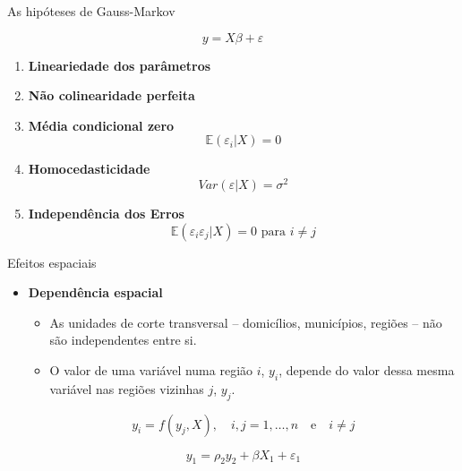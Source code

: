 \documentclass[aspectratio=169]{beamer}
\begin{document}
\begin{frame}{As hipóteses de Gauss-Markov}
	\begin{block}{}
	    \begin{equation}
        y = X\beta + \varepsilon
    \end{equation}
    \end{block}
    \begin{enumerate}
        \item \textbf{Lineariedade dos parâmetros}
        
        \item \textbf{Não colinearidade perfeita}
        
        \item \textbf{Média condicional zero}
        $$ \mathbb{E}(\varepsilon_i| X)=0$$
        
        \item \textbf{Homocedasticidade}
        $$Var(\varepsilon|X) = \sigma^2$$
        
        \item \textbf{Independência dos Erros}
        $$\mathbb{E}(\varepsilon_i \varepsilon_j | X) = 0  \text{ para } i \neq j$$
    \end{enumerate}
\end{frame}

\begin{frame}{Efeitos espaciais}
	\begin{itemize}
		\item \textbf{Dependência espacial}
		\vspace{0.5cm}
		\begin{itemize}
		    \item As unidades de corte transversal -- domicílios, municípios, regiões -- não são independentes entre si.
		    \item O valor de uma variável numa região $i$, $y_i$, depende do valor dessa mesma variável nas regiões vizinhas $j$, $y_j$. 
		\end{itemize}
		\vspace{0.5cm}
		\begin{block}{}
		    $$y_i = f(y_j,X), \quad i,j = 1,\dots, n \quad\text{e}\quad i\neq j$$
		\end{block}
		\vspace{0.25cm}
		$$ y_1 = \rho_2 y_2 + \beta X_1 +\varepsilon_1$$ 
	\end{itemize}
	\vspace{0.5cm}
\end{frame}
\end{document}
